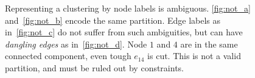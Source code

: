 \begin{center}
\begin{figure}[t]
\begin{tiny}
\end{tiny}
\vspace{-0.1cm}
\caption{
Representing a clustering by node labels is ambiguous.
\ref{fig:not_a} and~\ref{fig:not_b} encode the same partition.
Edge labels as in~\ref{fig:not_c} do not suffer from such 
ambiguities, but can have \emph{dangling edges} as in~\ref{fig:not_d}.
Node $1$ and $4$
are in the same connected component,
even tough $e_{14}$ is cut.
This is not a valid partition, and must be ruled out by constraints.
}\label{fig:notation}
\end{figure}
\end{center}

